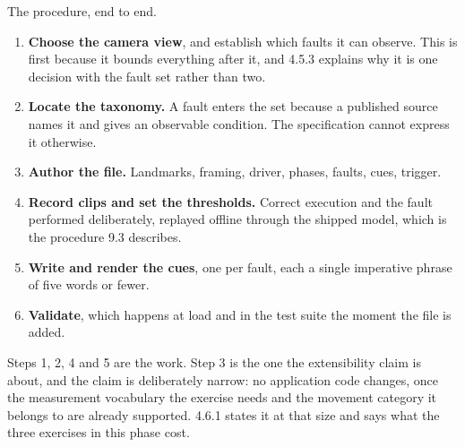 The procedure, end to end.

\begin{enumerate}
\item \textbf{Choose the camera view}, and establish which faults it can observe. This is first because it bounds everything after it, and 4.5.3 explains why it is one decision with the fault set rather than two.
\item \textbf{Locate the taxonomy.} A fault enters the set because a published source names it and gives an observable condition. The specification cannot express it otherwise.
\item \textbf{Author the file.} Landmarks, framing, driver, phases, faults, cues, trigger.
\item \textbf{Record clips and set the thresholds.} Correct execution and the fault performed deliberately, replayed offline through the shipped model, which is the procedure 9.3 describes.
\item \textbf{Write and render the cues}, one per fault, each a single imperative phrase of five words or fewer.
\item \textbf{Validate}, which happens at load and in the test suite the moment the file is added.
\end{enumerate}

Steps 1, 2, 4 and 5 are the work. Step 3 is the one the extensibility claim is about, and the claim is deliberately narrow: no application code changes, once the measurement vocabulary the exercise needs and the movement category it belongs to are already supported. 4.6.1 states it at that size and says what the three exercises in this phase cost.
